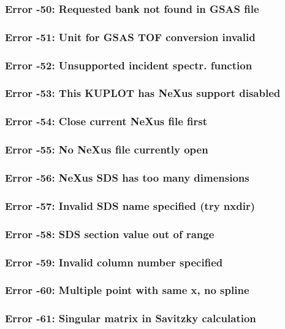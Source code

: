 \subsubsection{Error -50: Requested bank not found in GSAS file}
\subsubsection{Error -51: Unit for GSAS TOF conversion invalid}
\subsubsection{Error -52: Unsupported incident spectr. function}
\subsubsection{Error -53: This KUPLOT has NeXus support disabled}
\subsubsection{Error -54: Close current NeXus file first}
\subsubsection{Error -55: No NeXus file currently open}
\subsubsection{Error -56: NeXus SDS has too many dimensions}
\subsubsection{Error -57: Invalid SDS name specified (try nxdir)}
\subsubsection{Error -58: SDS section value out of range}
\subsubsection{Error -59: Invalid column number specified}
\subsubsection{Error -60: Multiple point with same x, no spline}
\subsubsection{Error -61: Singular matrix in Savitzky calculation}
\par
